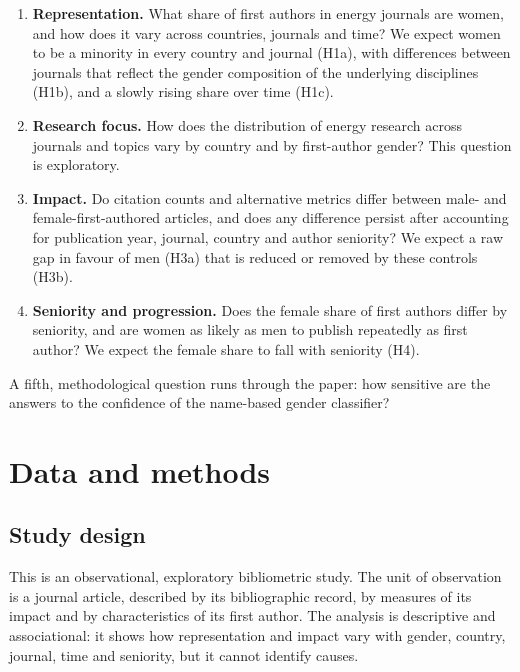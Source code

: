 \documentclass[preprint,12pt,number]{elsarticle}
\begin{document}
\begin{enumerate}
    \item \textbf{Representation.} What share of first authors in energy journals are women, and how does it vary across countries, journals and time? We expect women to be a minority in every country and journal (H1a), with differences between journals that reflect the gender composition of the underlying disciplines (H1b), and a slowly rising share over time (H1c).
    \item \textbf{Research focus.} How does the distribution of energy research across journals and topics vary by country and by first-author gender? This question is exploratory.
    \item \textbf{Impact.} Do citation counts and alternative metrics differ between male- and female-first-authored articles, and does any difference persist after accounting for publication year, journal, country and author seniority? We expect a raw gap in favour of men (H3a) that is reduced or removed by these controls (H3b).
    \item \textbf{Seniority and progression.} Does the female share of first authors differ by seniority, and are women as likely as men to publish repeatedly as first author? We expect the female share to fall with seniority (H4).
\end{enumerate}

A fifth, methodological question runs through the paper: how sensitive are the answers to the confidence of the name-based gender classifier?

\section{Data and methods}

\subsection{Study design}

This is an observational, exploratory bibliometric study. The unit of observation is a journal article, described by its bibliographic record, by measures of its impact and by characteristics of its first author. The analysis is descriptive and associational: it shows how representation and impact vary with gender, country, journal, time and seniority, but it cannot identify causes.
\end{document}
